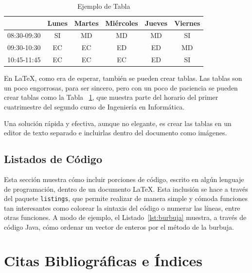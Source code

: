 \documentclass{article}
\begin{document}
\begin{table}[!b]
	\begin{center}
		\begin{tabular}{|l|c|c|c|c|c|}
		\hline
		             & Lunes & Martes & Miércoles & Jueves & Viernes \\ \hline
		 08:30-09:30 & SI    & MD     & MD        & MD     & SI \\ \hline
		 09:30-10:30 & EC    & EC     & ED        & ED     & MD \\ \hline
		 10:45-11:45 & EC    & EC     & EC        & ED     & SI \\ \hline	 	          
		\end{tabular}
		\caption{Ejemplo de Tabla}
		\label{tabla:ejemplo}
	\end{center}
\end{table}

En \LaTeX, como era de esperar, también se pueden crear tablas. Las tablas son un poco engorrosas, para ser sincero, pero con un poco de paciencia se pueden crear tablas como la Tabla ~\ref{tabla:ejemplo}, que muestra parte del horario del primer cuatrimestre del segundo curso de Ingeniería en Informática.

Una solución rápida y efectiva, aunque no elegante, es crear las tablas en un editor de texto separado e incluirlas dentro del documento como imágenes.

\subsection{Listados de Código}

Esta sección muestra cómo incluir porciones de código, escrito en algún lenguaje de programación, dentro de un documento \LaTeX. Esta inclusión se hace a través del paquete \texttt{listings}, que permite realizar de manera simple y cómoda funciones tan interesantes como colorear la sintaxis del código o numerar las líneas, entre otras funciones. A modo de ejemplo, el Listado~\ref{lst:burbuja} muestra, a través de código Java, cómo ordenar un vector de enteros por el método de la burbuja. 



\section{Citas Bibliográficas e Índices}
\end{document}
